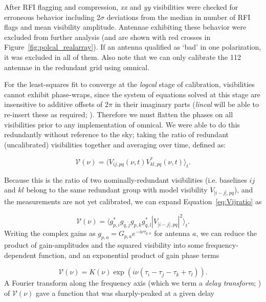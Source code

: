 After RFI flagging and compression, \textit{xx} and \textit{yy} visibilities were checked for erroneous behavior including 2$\sigma$ deviations from the median in number of RFI flags and mean visibility amplitude. Antennae exhibiting these behavior were excluded from further analysis (and are shown with red crosses in Figure~\ref{fig:polcal_realarray}). If an antenna qualified as `bad' in one polarization, it was excluded in all of them. Also note that we can only calibrate the 112 antennae in the redundant grid using {\sc omnical}.

For the least-squares fit to converge at the \textit{logcal} stage of calibration, visibilities cannot exhibit phase-wraps, since the system of equations solved at this stage are insensitive to additive offsets of $2\pi$ in their imaginary parts (\textit{lincal} will be able to re-insert these as required; \citealt{Liu.10}). Therefore we must flatten the phases on all visibilities prior to any implementation of {\sc omnical}. We were able to do this redundantly without reference to the sky; taking the ratio of redundant (uncalibrated) visibilities together and averaging over time, defined as:

\begin{equation}
\mathcal{V}(\nu) = \langle V_{ij, pq}(\nu,t)V^*_{kl, pq}(\nu,t) \rangle_t .
\label{eq:Vijratio}
\end{equation}

Because this is the ratio of two nominally-redundant visibilities (i.e. baselines $ij$ and $kl$ belong to the same redundant group with model visibility $V_{|i-j|,pq}$), and the measurements are not yet calibrated, we can expand Equation~\ref{eq:Vijratio} as

\begin{equation}
\mathcal{V}(\nu) = \langle g^*_{p,i}g_{q,j}g_{p,k}g^*_{q,l} |V_{|i-j|,pq}|^2 \rangle_t .
\end{equation}
Writing the complex gains as $g_{p,a}=G_{p,a} e^{-i\nu\tau_{p,a}}$ for antenna $a$, we can reduce the product of gain-amplitudes and the squared visibility into some frequency-dependent function, and an exponential product of gain phase terms

\begin{equation}
\mathcal{V}(\nu) = K(\nu)\exp\left(i\nu (\tau_i - \tau_j - \tau_k + \tau_l)\right) .
\end{equation}
A Fourier transform along the frequency axis (which we term a \textit{delay transform}; \citealt{Parsons.12a}) of $\mathcal{V}(\nu)$ gave a function that was sharply-peaked at a given delay


